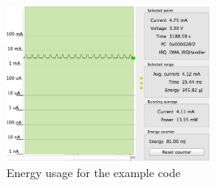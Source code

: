 \begin{figure}[H]
    \centering
    \includegraphics[width=250px]{figures/sw/preamp.png}
    \caption{Energy usage for the example code}
    \label{fig:preamp}
\end{figure}
